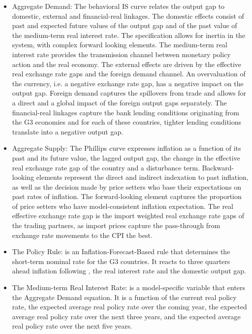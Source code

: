 \documentclass[11pt,a4paper]{article}
\begin{document}
	\begin{itemize}
		\item Aggregate Demand: The behavioral IS curve relates the output gap to domestic, external and financial-real linkages. The domestic effects consist of past and expected future values of the output gap and of the past value of the medium-term real interest rate. The specification allows for inertia in the system, with complex forward looking elements. The medium-term real interest rate provides the transmission channel between monetary policy action and the real economy. The external effects are driven by the effective real exchange rate gaps and the foreign demand channel. An overvaluation of the currency, i.e. a negative exchange rate gap, has a negative impact on the output gap. Foreign demand captures the spillovers from trade and allows for a direct and a global impact of the foreign output gaps separately. The financial-real linkages capture the bank lending conditions originating from the G3 economies and for each of these countries, tighter lending conditions translate into a negative output gap.  
		\item Aggregate Supply: The Phillips curve expresses inflation as a function of its past and its future value, the lagged output gap, the change in the effective real exchange rate gap of the country and a disturbance term. Backward-looking elements represent the direct and indirect indexation to past inflation, as well as the decision made by price setters who base their expectations on past rates of inflation. The forward-looking element captures the proportion of price setters who have model-consistent inflation expectation. The real effective exchange rate gap is the import weighted real exchange rate gaps of the trading partners, as import prices capture the pass-through from exchange rate movements to the CPI the best.
		
		\item The Policy Rule: is an Inflation-Forecast-Based rule that determines the short-term nominal rate for the G3 countries. It reacts to three quarters ahead inflation following \cite{Orphanides20032}, the real interest rate and the domestic output gap.
		\item The Medium-term Real Interest Rate: is a model-specific variable that enters the Aggregate Demand equation.  It is a function of the current real policy rate, the expected average real policy rate over the coming year, the expected average real policy rate over the next three years, and the expected average real policy rate over the next five years.
		

\end{itemize}
\end{document}
